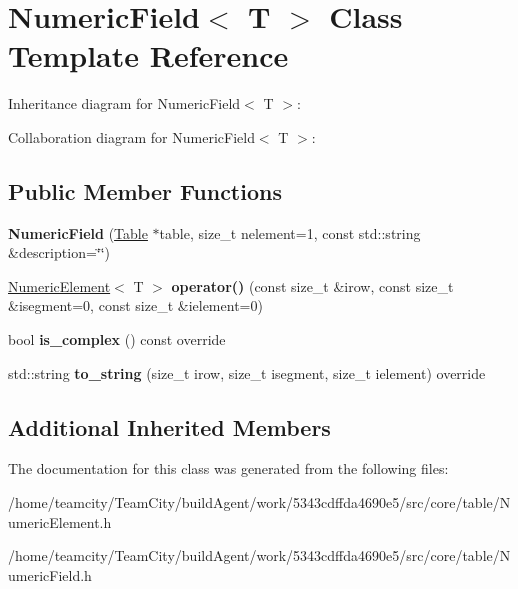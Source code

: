 \hypertarget{classNumericField}{}\section{Numeric\+Field$<$ T $>$ Class Template Reference}
\label{classNumericField}


Inheritance diagram for Numeric\+Field$<$ T $>$\+:


Collaboration diagram for Numeric\+Field$<$ T $>$\+:
\subsection*{Public Member Functions}
\begin{DoxyCompactItemize}
\item 
{\bfseries Numeric\+Field} (\hyperlink{classTable}{Table} $\ast$table, size\+\_\+t nelement=1, const std\+::string \&description=\char`\"{}\char`\"{})\hypertarget{classNumericField_a6d7995b8ceaf2dacb70bac6d36e4d22d}{}\label{classNumericField_a6d7995b8ceaf2dacb70bac6d36e4d22d}

\item 
\hyperlink{classNumericElement}{Numeric\+Element}$<$ T $>$ {\bfseries operator()} (const size\+\_\+t \&irow, const size\+\_\+t \&isegment=0, const size\+\_\+t \&ielement=0)\hypertarget{classNumericField_a14e5e07e53f4f3cf2a66241d1b61e7b6}{}\label{classNumericField_a14e5e07e53f4f3cf2a66241d1b61e7b6}

\item 
bool {\bfseries is\+\_\+complex} () const override\hypertarget{classNumericField_abd6e2c46cf5d17fc439556a071ddfd73}{}\label{classNumericField_abd6e2c46cf5d17fc439556a071ddfd73}

\item 
std\+::string {\bfseries to\+\_\+string} (size\+\_\+t irow, size\+\_\+t isegment, size\+\_\+t ielement) override\hypertarget{classNumericField_aaf5df8fe0c9cdb5007d6de32cf683b24}{}\label{classNumericField_aaf5df8fe0c9cdb5007d6de32cf683b24}

\end{DoxyCompactItemize}
\subsection*{Additional Inherited Members}


The documentation for this class was generated from the following files\+:\begin{DoxyCompactItemize}
\item 
/home/teamcity/\+Team\+City/build\+Agent/work/5343cdffda4690e5/src/core/table/Numeric\+Element.\+h\item 
/home/teamcity/\+Team\+City/build\+Agent/work/5343cdffda4690e5/src/core/table/Numeric\+Field.\+h\end{DoxyCompactItemize}
